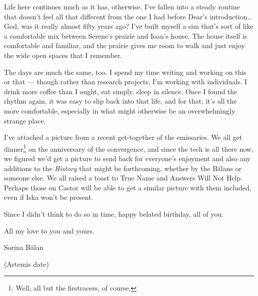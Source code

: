 Life here continues much as it has, otherwise. I've fallen into a steady routine that doesn't feel all that different from the one I had before Dear's introduction\ldots God, was it really almost fifty years ago? I've built myself a sim that's sort of like a comfortable mix between Serene's prairie and Ioan's house. The house itself is comfortable and familiar, and the prairie gives me room to walk and just enjoy the wide open spaces that I remember.

The days are much the same, too. I spend my time writing and working on this or that — though rather than research projects, I'm working with individuals. I drink more coffee than I ought, eat simply, sleep in silence. Once I found the rhythm again, it was easy to slip back into that life, and for that, it's all the more comfortable, especially in what might otherwise be an overwhelmingly strange place.

I've attached a picture from a recent get-together of the emissaries. We all get dinner\footnote{Well, all but the firstracers, of course.} on the anniversary of the convergence, and since the tech is all there now, we figured we'd get a picture to send back for everyone's enjoyment and also any additions to the \emph{History} that might be forthcoming, whether by the Bălans or someone else. We all raised a toast to True Name and Answers Will Not Help. Perhaps those on Castor will be able to get a similar picture with them included, even if Iska won't be present.

Since I didn't think to do so in time, happy belated birthday, all of you.

All my love to you and yours.

Sorina Bălan

(Artemis date)

